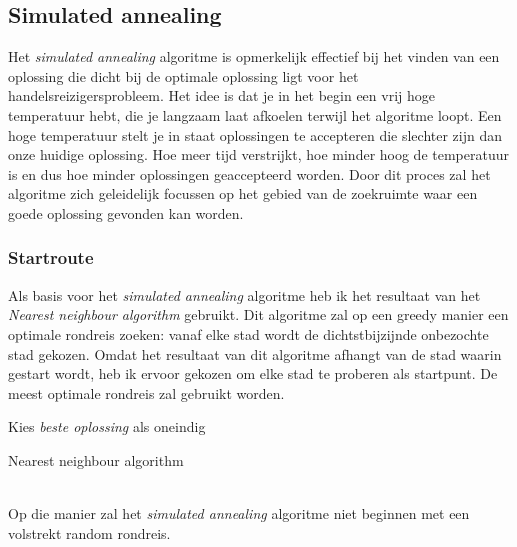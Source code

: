 \documentclass[12pt]{article}
\begin{document}
\subsection{Simulated annealing}
Het \textit{simulated annealing} algoritme is opmerkelijk effectief bij het vinden van een oplossing die dicht bij de optimale oplossing ligt voor het handelsreizigersprobleem. Het idee is dat je in het begin een vrij hoge temperatuur hebt, die je langzaam laat afkoelen terwijl het algoritme loopt. Een hoge temperatuur stelt je in staat oplossingen te accepteren die slechter zijn dan onze huidige oplossing.  Hoe meer tijd verstrijkt, hoe minder hoog de temperatuur is en dus hoe minder oplossingen geaccepteerd worden. Door dit proces zal het algoritme zich geleidelijk focussen op het gebied van de zoekruimte waar een goede oplossing gevonden kan worden.
\subsubsection{Startroute}
Als basis voor het  \textit{simulated annealing} algoritme heb ik het resultaat van het \textit{Nearest neighbour algorithm} gebruikt. Dit algoritme zal op een greedy manier een optimale rondreis zoeken: vanaf elke stad wordt de dichtstbijzijnde onbezochte stad gekozen. Omdat het resultaat van dit algoritme afhangt van de stad waarin gestart wordt, heb ik ervoor gekozen om elke stad te proberen als startpunt. De meest optimale rondreis zal gebruikt worden.
\\
\newline
\begin{algorithm}[H]
\SetAlgoLined 
Kies \textit{beste oplossing} als oneindig\;
 \caption{Nearest neighbour algorithm}
\end{algorithm}
\noindent
\\
Op die manier zal het \textit{simulated annealing} algoritme niet beginnen met een volstrekt random rondreis.
\end{document}
